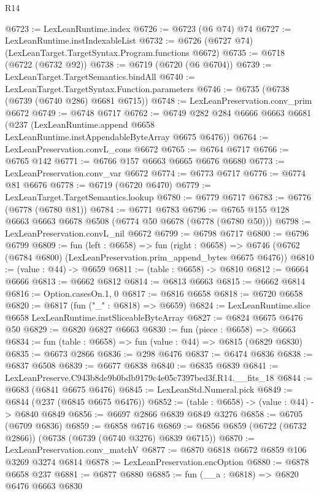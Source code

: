 \begin{lexlean}{R14}
\begin{coremodule}
@6723 := LexLeanRuntime.index
@6726 := @6723 (@6 @74) @74
@6727 := LexLeanRuntime.instIndexableList
@6732 := @6726 (@6727 @74) (LexLeanTarget.TargetSyntax.Program.functions @6672)
@6735 := @6718 (@6722 (@6732 @92))
@6738 := @6719 (@6720 (@6 @6704))
@6739 := LexLeanTarget.TargetSemantics.bindAll
@6740 := LexLeanTarget.TargetSyntax.Function.parameters
@6746 := @6735 (@6738 (@6739 (@6740 @286) @6681 @6715))
@6748 := LexLeanPreservation.conv_prim @6672
@6749 := @6748 @6717
@6762 := @6749
    @282
    @284
    @6666
    @6663
    @6681
    (@237 (LexLeanRuntime.append @6658 LexLeanRuntime.instAppendableByteArray @6675 @6476))
@6764 := LexLeanPreservation.convL_cons @6672
@6765 := @6764 @6717
@6766 := @6765 @142
@6771 := @6766 @157 @6663 @6665 @6676 @6680
@6773 := LexLeanPreservation.conv_var @6672
@6774 := @6773 @6717
@6776 := @6774 @81 @6676
@6778 := @6719 (@6720 @6470)
@6779 := LexLeanTarget.TargetSemantics.lookup
@6780 := @6779 @6717
@6783 := @6776 (@6778 (@6780 @81))
@6784 := @6771 @6783
@6796 := @6765 @155 @128 @6663 @6663 @6678 @6508 (@6774 @50 @6678 (@6778 (@6780 @50)))
@6798 := LexLeanPreservation.convL_nil @6672
@6799 := @6798 @6717
@6800 := @6796 @6799
@6809 := fun (left : @6658) =>
  fun (right : @6658) =>
  @6746 (@6762 (@6784 @6800) (LexLeanPreservation.prim_append_bytes @6675 @6476))
@6810 := (value : @44) -> @6659
@6811 := (table : @6658) -> @6810
@6812 := @6664 @6666
@6813 := @6662 @6812
@6814 := @6813 @6663
@6815 := @6662 @6814
@6816 := Option.casesOn.{1, 0}
@6817 := @6816 @6658
@6818 := @6720 @6658
@6820 := @6817 (fun ("_" : @6818) => @6659)
@6824 := LexLeanRuntime.slice @6658 LexLeanRuntime.instSliceableByteArray
@6827 := @6824 @6675 @6476 @50
@6829 := @6820 @6827 @6663
@6830 := fun (piece : @6658) => @6663
@6834 := fun (table : @6658) => fun (value : @44) => @6815 (@6829 @6830)
@6835 := @6673 @2866
@6836 := @298 @6476
@6837 := @6474 @6836
@6838 := @6837 @6508
@6839 := @6677 @6838
@6840 := @6835 @6839
@6841 := LexLeanPreserve.C943b8de9b0bdb9179c4e05c7397bed3f.R14.__fits_18
@6844 := @6683 (@6841 @6675 @6476)
@6845 := LexLeanStd.Numeral.pick
@6849 := @6844 (@237 (@6845 @6675 @6476))
@6852 := (table : @6658) -> (value : @44) -> @6840 @6849
@6856 := @6697 @2866 @6839 @6849 @3276
@6858 := @6705 (@6709 @6836)
@6859 := @6858 @6716
@6869 := @6856 @6859 (@6722 (@6732 @2866)) (@6738 (@6739 (@6740 @3276) @6839 @6715))
@6870 := LexLeanPreservation.conv_matchV
@6877 := @6870 @6818 @6672 @6859 @106 @3269 @3274 @6814
@6878 := LexLeanPreservation.encOption
@6880 := @6878 @6658 @237
@6881 := @6877 @6880
@6885 := fun (__a : @6818) => @6820 @6476 @6663 @6830

\end{coremodule}
\end{lexlean}
